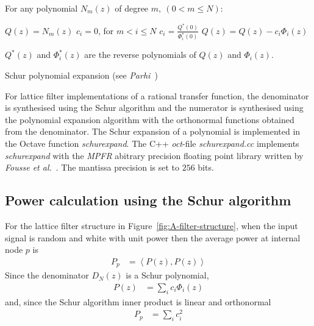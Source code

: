 \documentclass[a4paper,twoside,10pt,english]{report}
\begin{document}
\begin{algorithm}[!htbp]
For any polynomial $N_{m}\left(z\right)$ of degree $m,\:(0<m\leq N)$:
\begin{algorithmic}
\State $Q\left(z\right)=N_{m}\left(z\right)$ 
\State $c_{i}=0$, for $m<i\leq N$
  \State $c_{i}=\frac{Q^{*}(0)}{\Phi_{i}^{*}(0)}$
  \State $Q\left(z\right)=Q\left(z\right)-c_{i}\Phi_{i}\left(z\right)$
\EndFor
\end{algorithmic}
$Q^{*}\left(z\right)$ and $\Phi_{i}^{*}\left(z\right)$ are the reverse
polynomials of $Q\left(z\right)$ and $\Phi_{i}\left(z\right)$.
\caption{Schur polynomial expansion (see 
\emph{Parhi}~\cite[Section 12.2.3]{Parhi_VLSIDigitalSignalProcessingSystems})}
\label{alg:Polynomial-Expansion}
\end{algorithm}

For lattice filter implementations of a rational transfer function, the
denominator is synthesised using the Schur algorithm and the numerator is 
synthesised using the polynomial expansion algorithm with the orthonormal
functions obtained from the denominator. The Schur expansion of a polynomial
is implemented in the Octave function \emph{schurexpand}. The C++ 
\emph{oct}-file \emph{schurexpand.cc} implements \emph{schurexpand} with the
\emph{MPFR} abitrary precision floating point library 
\cite{Fousse_MPFR, GNU_GMP} written by 
\emph{Fousse et al.}~\cite{Fousse:2007:MMB:1236463.1236468}. The mantissa 
precision is set to $256$ bits.

\subsection{Power calculation using the Schur algorithm}
For the lattice filter structure in Figure~\ref{fig:A-filter-structure},
when the input signal is random and white with unit power then the
average power at internal node $p$ is
\begin{align*}
P_{p} & = \left\langle P\left(z\right),P\left(z\right)\right\rangle 
\end{align*}
Since the denominator $D_{N}\left(z\right)$ is a Schur polynomial,
\begin{align*}
P\left(z\right) & = \sum_{i}c_{i}\Phi_{i}\left(z\right)
\end{align*}
and, since the Schur algorithm inner product is linear and orthonormal
\begin{align*}
P_{p} & = \sum_{i}c_{i}^{2}
\end{align*}
\end{document}
